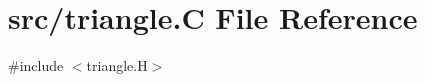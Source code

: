 \hypertarget{triangle_8_c}{}\section{src/triangle.C File Reference}
\label{triangle_8_c}
{\ttfamily \#include $<$triangle.\+H$>$}\newline

